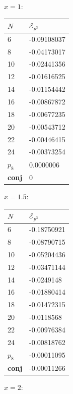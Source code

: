 \documentclass[a4paper,10pt]{article}
\begin{document}
\begin{table}[h]
\begin{minipage}{0.25\linewidth}
$x=1$: 


\begin{tabular}{ll}
$N$ & $\mathcal{E}_{p^3}$ \\
\hline
6 & -0.09108037 \\
8 & -0.04173017 \\
10 & -0.02441356 \\
12 & -0.01616525 \\
14 & -0.01154442 \\
16 & -0.00867872 \\
18 & -0.00677235 \\
20 & -0.00543712 \\
22 & -0.00446415 \\
24 & -0.00373254 \\
$p_8$ & \phantom{-}0.0000006\\
\bf{conj} &  \phantom{-}0\\
\hline
\end{tabular}
\end{minipage}%
\begin{minipage}{0.25\linewidth}
$x=1.5$: 


\begin{tabular}{ll}
$N$ & $\mathcal{E}_{p^3}$ \\
\hline
6 & -0.18750921 \\
8 & -0.08790715 \\
10 & -0.05204436 \\
12 & -0.03471144 \\
14 & -0.0249148 \\
16 & -0.01880414 \\
18 & -0.01472315 \\
20 & -0.0118568 \\
22 & -0.00976384 \\
24 & -0.00818762 \\
$p_8$ & -0.00011095 \\
\bf{conj} &  -0.00011266 \\
\hline
\end{tabular}
\end{minipage}%
\begin{minipage}{0.25\linewidth}
$x=2$: 



\end{minipage}
\end{table}
\end{document}
